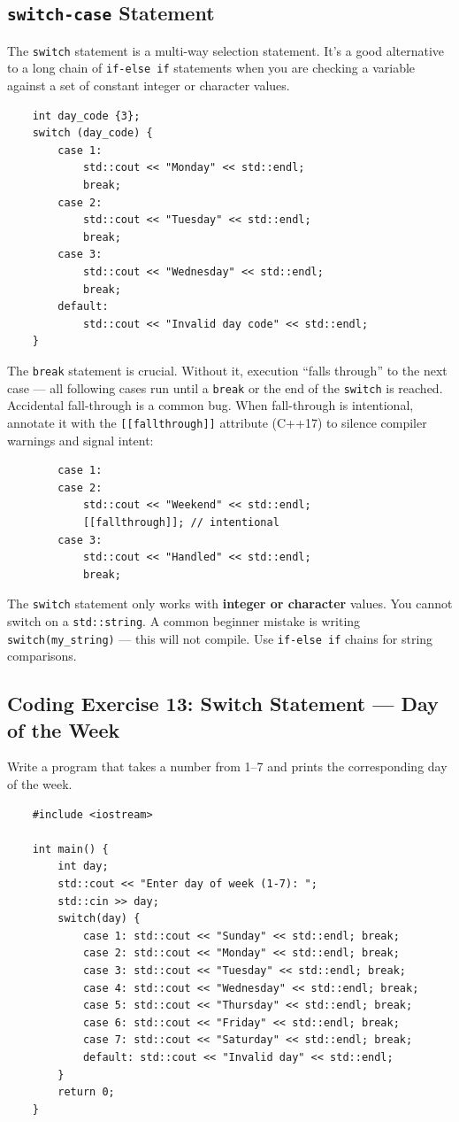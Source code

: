 \subsection{\texttt{switch-case} Statement}
The \texttt{switch} statement is a multi-way selection statement. It's a good alternative to a long chain of \texttt{if-else if} statements when you are checking a variable against a set of constant integer or character values.
\begin{lstlisting}
	int day_code {3};
	switch (day_code) {
		case 1:
			std::cout << "Monday" << std::endl;
			break;
		case 2:
			std::cout << "Tuesday" << std::endl;
			break;
		case 3:
			std::cout << "Wednesday" << std::endl;
			break;
		default:
			std::cout << "Invalid day code" << std::endl;
	}
\end{lstlisting}
\begin{remark}
	The \texttt{break} statement is crucial. Without it, execution ``falls through'' to the next case — all following cases run until a \texttt{break} or the end of the \texttt{switch} is reached. Accidental fall-through is a common bug. When fall-through is intentional, annotate it with the \texttt{[[fallthrough]]} attribute (C++17) to silence compiler warnings and signal intent:
	\begin{lstlisting}
		case 1:
		case 2:
			std::cout << "Weekend" << std::endl;
			[[fallthrough]]; // intentional
		case 3:
			std::cout << "Handled" << std::endl;
			break;
	\end{lstlisting}
\end{remark}

\begin{remark}
	The \texttt{switch} statement only works with \textbf{integer or character} values. You cannot switch on a \texttt{std::string}. A common beginner mistake is writing \texttt{switch(my\_string)} — this will not compile. Use \texttt{if-else if} chains for string comparisons.
\end{remark}

\subsection{Coding Exercise 13: Switch Statement --- Day of the Week}
Write a program that takes a number from 1--7 and prints the corresponding day of the week.
\begin{lstlisting}
	#include <iostream>

	int main() {
		int day;
		std::cout << "Enter day of week (1-7): ";
		std::cin >> day;
		switch(day) {
			case 1: std::cout << "Sunday" << std::endl; break;
			case 2: std::cout << "Monday" << std::endl; break;
			case 3: std::cout << "Tuesday" << std::endl; break;
			case 4: std::cout << "Wednesday" << std::endl; break;
			case 5: std::cout << "Thursday" << std::endl; break;
			case 6: std::cout << "Friday" << std::endl; break;
			case 7: std::cout << "Saturday" << std::endl; break;
			default: std::cout << "Invalid day" << std::endl;
		}
		return 0;
	}
\end{lstlisting}

